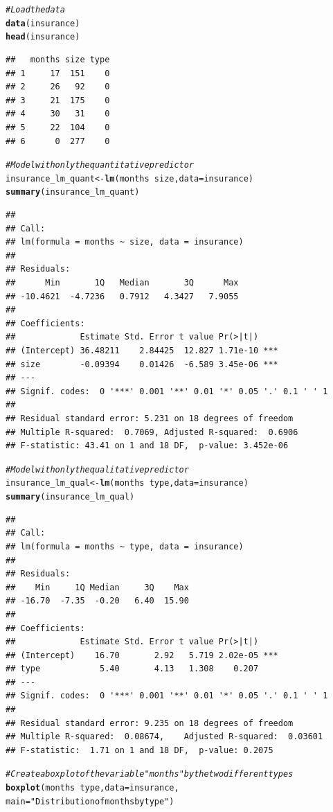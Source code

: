 \documentclass{article}\usepackage[]{graphicx}\usepackage[]{color}
\makeatletter
\newcommand{\hlstr}[1]{\textcolor[rgb]{0.192,0.494,0.8}{#1}}%
\newcommand{\hlcom}[1]{\textcolor[rgb]{0.678,0.584,0.686}{\textit{#1}}}%
\newcommand{\hlopt}[1]{\textcolor[rgb]{0,0,0}{#1}}%
\newcommand{\hlstd}[1]{\textcolor[rgb]{0.345,0.345,0.345}{#1}}%
\newcommand{\hlkwb}[1]{\textcolor[rgb]{0.69,0.353,0.396}{#1}}%
\newcommand{\hlkwc}[1]{\textcolor[rgb]{0.333,0.667,0.333}{#1}}%
\newcommand{\hlkwd}[1]{\textcolor[rgb]{0.737,0.353,0.396}{\textbf{#1}}}%
\newenvironment{kframe}{%
 \def\at@end@of@kframe{}%
 \ifinner\ifhmode%
  \def\at@end@of@kframe{\end{minipage}}%
  \begin{minipage}{\columnwidth}%
 \fi\fi%
 \def\FrameCommand##1{\hskip\@totalleftmargin \hskip-\fboxsep
 \colorbox{shadecolor}{##1}\hskip-\fboxsep
     \hskip-\linewidth \hskip-\@totalleftmargin \hskip\columnwidth}%
 \MakeFramed {\advance\hsize-\width
   \@totalleftmargin\z@ \linewidth\hsize
   \@setminipage}}%
 {\par\unskip\endMakeFramed%
 \at@end@of@kframe}
\newenvironment{knitrout}{}{} %
\makeatother
\begin{document}
\begin{knitrout}
\color{fgcolor}\begin{kframe}
\begin{alltt}
\hlcom{# Load the data}
\hlkwd{data}\hlstd{(insurance)}
\hlkwd{head}\hlstd{(insurance)}
\end{alltt}
\begin{verbatim}
##   months size type
## 1     17  151    0
## 2     26   92    0
## 3     21  175    0
## 4     30   31    0
## 5     22  104    0
## 6      0  277    0
\end{verbatim}
\begin{alltt}
\hlcom{# Model with only the quantitative predictor}
\hlstd{insurance_lm_quant} \hlkwb{<-} \hlkwd{lm}\hlstd{(months} \hlopt{~} \hlstd{size,} \hlkwc{data} \hlstd{= insurance)}
\hlkwd{summary}\hlstd{(insurance_lm_quant)}
\end{alltt}
\begin{verbatim}
## 
## Call:
## lm(formula = months ~ size, data = insurance)
## 
## Residuals:
##      Min       1Q   Median       3Q      Max 
## -10.4621  -4.7236   0.7912   4.3427   7.9055 
## 
## Coefficients:
##             Estimate Std. Error t value Pr(>|t|)    
## (Intercept) 36.48211    2.84425  12.827 1.71e-10 ***
## size        -0.09394    0.01426  -6.589 3.45e-06 ***
## ---
## Signif. codes:  0 '***' 0.001 '**' 0.01 '*' 0.05 '.' 0.1 ' ' 1
## 
## Residual standard error: 5.231 on 18 degrees of freedom
## Multiple R-squared:  0.7069,	Adjusted R-squared:  0.6906 
## F-statistic: 43.41 on 1 and 18 DF,  p-value: 3.452e-06
\end{verbatim}
\begin{alltt}
\hlcom{# Model with only the qualitative predictor}
\hlstd{insurance_lm_qual} \hlkwb{<-} \hlkwd{lm}\hlstd{(months} \hlopt{~} \hlstd{type,} \hlkwc{data} \hlstd{= insurance)}
\hlkwd{summary}\hlstd{(insurance_lm_qual)}
\end{alltt}
\begin{verbatim}
## 
## Call:
## lm(formula = months ~ type, data = insurance)
## 
## Residuals:
##    Min     1Q Median     3Q    Max 
## -16.70  -7.35  -0.20   6.40  15.90 
## 
## Coefficients:
##             Estimate Std. Error t value Pr(>|t|)    
## (Intercept)    16.70       2.92   5.719 2.02e-05 ***
## type            5.40       4.13   1.308    0.207    
## ---
## Signif. codes:  0 '***' 0.001 '**' 0.01 '*' 0.05 '.' 0.1 ' ' 1
## 
## Residual standard error: 9.235 on 18 degrees of freedom
## Multiple R-squared:  0.08674,	Adjusted R-squared:  0.03601 
## F-statistic:  1.71 on 1 and 18 DF,  p-value: 0.2075
\end{verbatim}
\begin{alltt}
\hlcom{# Create a boxplot of the variable "months" by the two different types}
\hlkwd{boxplot}\hlstd{(months} \hlopt{~} \hlstd{type,} \hlkwc{data} \hlstd{= insurance,}
        \hlkwc{main} \hlstd{=} \hlstr{"Distribution of months by type"}\hlstd{)}
\end{alltt}
\end{kframe}


\end{knitrout}
\end{document}
